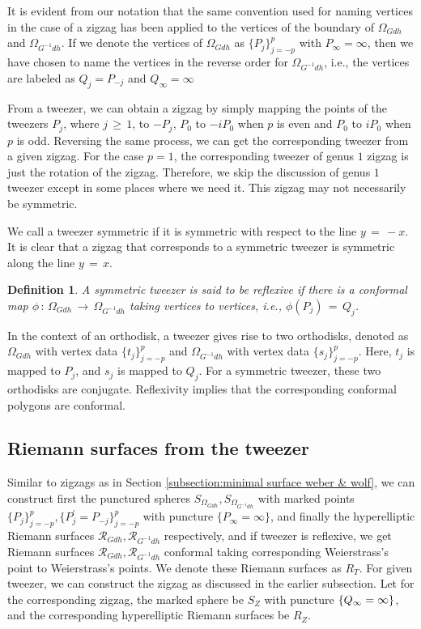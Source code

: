 \documentclass[12pt,epsfig,tikz,multi]{amsart}
\newtheorem{definition}[theorem]{Definition}
\numberwithin{equation}{section}
\begin{document}
It is evident from our notation that the same convention used for naming vertices in the case of a zigzag has been applied to the vertices of the boundary of $\Omega_{Gdh}$ and $\Omega_{G^{-1}dh}$. If we denote the vertices of $\Omega_{Gdh}$ as $\lbrace P_j\rbrace_{j=-p}^p$ with $P_{\infty}=\infty$, then we have chosen to name the vertices in the reverse order for $\Omega_{G^{-1}dh}$, i.e., the vertices are labeled as $Q_j=P_{-j}$ and $Q_{\infty}=\infty$

From a tweezer, we can obtain a zigzag by simply mapping the points of the tweezers $P_j$, where $j\,\geq\, 1$, 
to $-P_j$,  $P_0$  to $- i P_0$ when $p$ is even and $P_0$ to $ i P_0$ when $p$ is odd. Reversing the same process, we can get the corresponding tweezer from a given zigzag. For the case $p=1$, the corresponding tweezer of genus $1$ zigzag is just the rotation of the zigzag. Therefore, we skip the discussion of genus $1$ tweezer except in some places where we need it. This zigzag may not necessarily be symmetric.

We call a tweezer symmetric if it is symmetric with respect to the line $y\,=\,-x$. It is clear that
a zigzag that corresponds to a symmetric tweezer is symmetric along the line $y\,=\,x$.


\begin{definition}\label{defn:reflxive tweezers}
A symmetric tweezer is said to be reflexive if there is a conformal map $\phi\,:\, \Omega_{Gdh}
\,\longrightarrow\, \Omega_{G^{-1}dh}$ taking vertices to vertices, i.e., $\phi(P_j)\,=\,Q_j$.
\end{definition}

In the context of an orthodisk, a tweezer gives rise to two orthodisks, denoted as $\Omega_{Gdh}$ with vertex data $\lbrace t_j\rbrace_{j=-p}^{p}$ and $\Omega_{G^{-1}dh}$ with vertex data $\lbrace s_j\rbrace_{j=-p}^{p}$. Here, $t_j$ is mapped to $P_j$, and $s_j$ is mapped to $Q_j$. For a symmetric tweezer, these two orthodisks are conjugate. Reflexivity implies that the corresponding conformal polygons are conformal.

\subsection{Riemann surfaces from the tweezer}

Similar to zigzags as in Section \ref{subsection:minimal surface weber & wolf}, we can construct first the punctured spheres $S_{\Omega_{Gdh}},S_{\Omega_{G^{-1}dh}}$ with marked points $\lbrace P_j\rbrace_{j=-p}^{p}, \lbrace P^{\prime}_{j}= P_{-j}\rbrace_{j=-p}^{p}$ with puncture $\{P_{\infty}=\infty\}$\color{black},  and finally the hyperelliptic Riemann surfaces $\mathcal{R}_{Gdh},\mathcal{R}_{G^{-1}dh}$ respectively, and if tweezer is reflexive, we get Riemann surfaces $\mathcal{R}_{Gdh},\mathcal{R}_{G^{-1}dh}$ conformal taking corresponding Weierstrass's point to Weierstrass's points.   We denote these Riemann surfaces as $R_T$.   For given tweezer, we can construct the zigzag as discussed in the earlier subsection. Let for the corresponding zigzag, the marked sphere be $S_Z$ with puncture $\{Q_{\infty}=\color{black}\infty\}$, and the corresponding hyperelliptic Riemann surfaces 
be $R_Z$.
\end{document}
